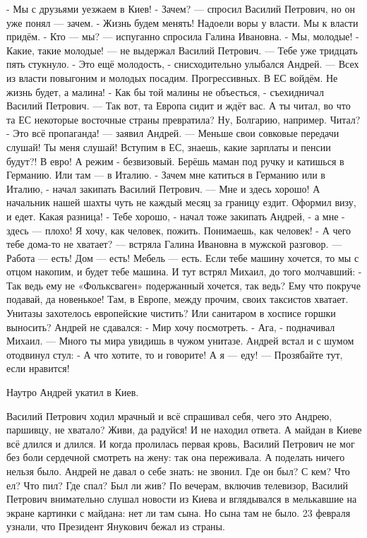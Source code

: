 - Мы с друзьями уезжаем в Киев!
- Зачем? --- спросил Василий Петрович, но он уже понял --- зачем.
- Жизнь будем менять! Надоели воры у власти. Мы к власти придём.
- Кто --- мы? --- испуганно спросила Галина Ивановна.
- Мы, молодые!
- Какие, такие молодые! --- не выдержал Василий Петрович. --- Тебе уже тридцать пять стукнуло.
- Это ещё молодость, - снисходительно улыбался Андрей. --- Всех из власти повыгоним и молодых посадим. Прогрессивных. В ЕС войдём. Не жизнь будет, а малина!
- Как бы той малины не объесться, - съехидничал Василий Петрович. --- Так вот, та Европа сидит и ждёт вас. А ты читал, во что та ЕС некоторые восточные страны превратила? Ну, Болгарию, например. Читал?
- Это всё пропаганда! --- заявил Андрей. --- Меньше свои совковые передачи слушай! Ты меня слушай! Вступим в ЕС, знаешь, какие зарплаты и пенсии будут?! В евро! А режим - безвизовый. Берёшь маман под ручку и катишься в Германию. Или там --- в Италию.
- Зачем мне катиться в Германию или в Италию, - начал закипать Василий Петрович. --- Мне и здесь хорошо! А начальник нашей шахты чуть не каждый месяц за границу ездит. Оформил визу, и едет. Какая разница!
- Тебе хорошо, - начал тоже закипать Андрей, - а мне - здесь --- плохо! Я хочу, как человек, пожить. Понимаешь, как человек!
- А чего тебе дома-то не хватает? --- встряла Галина Ивановна в мужской разговор. --- Работа --- есть! Дом --- есть! Мебель --- есть. Если тебе машину хочется, то мы с отцом накопим, и будет тебе машина.
И тут встрял Михаил, до того молчавший:
- Так ведь ему не «Фольксваген» подержанный хочется, так ведь? Ему что покруче подавай, да новенькое! Там, в Европе, между прочим, своих таксистов хватает. Унитазы захотелось европейские чистить? Или санитаром в хосписе горшки выносить?
Андрей не сдавался:
- Мир хочу посмотреть.
- Ага, - подначивал Михаил. --- Много ты мира увидишь в чужом унитазе.
Андрей встал и с шумом отодвинул стул:
- А что хотите, то и говорите! А я --- еду! --- Прозябайте тут, если нравится!

Наутро Андрей укатил в Киев.

Василий Петрович ходил мрачный и всё спрашивал себя, чего это Андрею, паршивцу, не хватало? Живи, да радуйся! И не находил ответа.
А майдан в Киеве всё длился и длился. И когда пролилась первая кровь, Василий Петрович не мог без боли сердечной смотреть на жену: так она переживала. А поделать ничего нельзя было. Андрей не давал о себе знать: не звонил. Где он был? С кем? Что ел? Что пил? Где спал? Был ли жив? По вечерам, включив телевизор, Василий Петрович внимательно слушал новости из Киева и вглядывался в мелькавшие на экране картинки с майдана: нет ли там сына. Но сына там не было.
23 февраля   узнали, что Президент Янукович бежал из страны.

